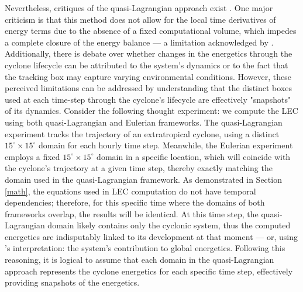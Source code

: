 Nevertheless, critiques of the quasi-Lagrangian approach exist \citep[e.g.]{dias2011energy}. One major criticism is that this method does not allow for the local time derivatives of energy terms due to the absence of a fixed computational volume, which impedes a complete closure of the energy balance — a limitation acknowledged by \citet{michaelides1999quasi}. Additionally, there is debate over whether changes in the energetics through the cyclone lifecycle can be attributed to the system's dynamics or to the fact that the tracking box may capture varying environmental conditions. However, these perceived limitations can be addressed by understanding that the distinct boxes used at each time-step through the cyclone's lifecycle are effectively "snapshots" of its dynamics. Consider the following thought experiment: we compute the LEC using both quasi-Lagrangian and Eulerian frameworks. The quasi-Lagrangian experiment tracks the trajectory of an extratropical cyclone, using a distinct \(15^\circ \times 15^\circ\) domain for each hourly time step. Meanwhile, the Eulerian experiment employs a fixed \(15^\circ \times 15^\circ\) domain in a specific location, which will coincide with the cyclone's trajectory at a given time step, thereby exactly matching the domain used in the quasi-Lagrangian framework. As demonstrated in Section \ref{math}, the equations used in LEC computation do not have temporal dependencies; therefore, for this specific time where the domains of both frameworks overlap, the results will be identical. At this time step, the quasi-Lagrangian domain likely contains only the cyclonic system, thus the computed energetics are indisputably linked to its development at that moment — or, using \citet{smith1969contribution}'s interpretation: the system's contribution to global energetics. Following this reasoning, it is logical to assume that each domain in the quasi-Lagrangian approach represents the cyclone energetics for each specific time step, effectively providing snapshots of the energetics.

